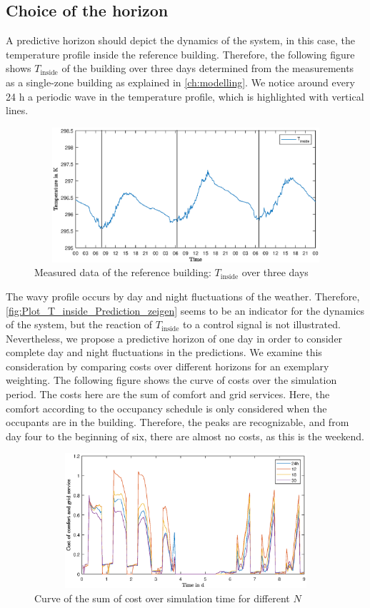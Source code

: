 \subsection{Choice of the horizon}
\label{subsec:ChoiceHorizon}
A predictive horizon should depict the dynamics of the system, in this case, the temperature profile inside the reference building. Therefore, the following figure shows $T_\text{inside}$ of the building over three days determined from the measurements as a single-zone building as explained in \autoref{ch:modelling}. We notice around every 24 h a periodic wave in the temperature profile, which is highlighted with vertical lines.\newline
    \begin{figure}[H]
            \centering
            \includegraphics[width=15cm,height=5cm]{figure/Plot_T_inside_Prediction_zeigen.eps}
           \caption{Measured data of the reference building: $T_\text{inside}$ over three days}
            \label{fig:Plot_T_inside_Prediction_zeigen}
    \end{figure}
The wavy profile occurs by day and night fluctuations of the weather. Therefore, \autoref{fig:Plot_T_inside_Prediction_zeigen} seems to be an indicator for the dynamics of the system, but the reaction of $T_\text{inside}$ to a control signal is not illustrated. Nevertheless, we propose a predictive horizon of one day in order to consider complete day and night fluctuations in the predictions. We examine this consideration by comparing costs over different horizons for an exemplary weighting. The following figure shows the curve of costs over the simulation period. The costs here are the sum of comfort and grid services. Here, the comfort according to the occupancy schedule is only considered when the occupants are in the building. Therefore, the peaks are recognizable, and from day four to the beginning of six, there are almost no costs, as this is the weekend.
    \begin{figure}[H]
            \centering
            \includegraphics[width=15cm,height=5cm]{figure/Gesamtkosten_Vergleich_horizonte.eps}
           \caption{Curve of the sum of cost over simulation time for different $N$}
            \label{fig:Gesamtkosten_Vergleich_horizonte}
    \end{figure}
